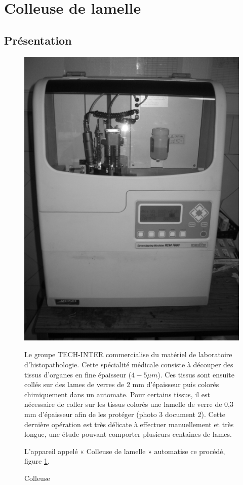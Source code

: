 

\section{Colleuse de lamelle}

\subsection{Présentation}

\begin{figure}[!h]
  \begin{minipage}{0.35\linewidth}
  \centering\includegraphics[width=0.8\linewidth]{img/colleuse.png}
  \caption{Colleuse}
  \label{img1}
  \end{minipage}
  \hfill
  \begin{minipage}{0.60\linewidth}
  Le groupe TECH-INTER commercialise du matériel de laboratoire d'histopathologie. Cette spécialité médicale consiste à découper des tissus d'organes en fine épaisseur ($4-5 \mu m$). Ces tissus sont ensuite collés sur des lames de verres de 2 mm d'épaisseur puis colorés chimiquement dans un automate. Pour certains tissus, il est nécessaire de coller sur les tissus colorés une lamelle de verre de 0,3 mm d'épaisseur afin de les protéger (photo 3 document 2). Cette dernière opération est très délicate à effectuer manuellement et très longue, une étude pouvant comporter plusieurs centaines de lames.

  L'appareil appelé « Colleuse de lamelle » automatise ce procédé, figure \ref{img1}.
\end{minipage}
\end{figure}

